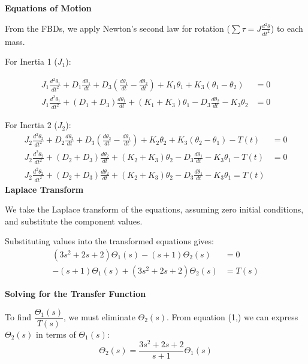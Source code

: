 \documentclass[11pt]{article}
\begin{document}
\noindent\textbf{Equations of Motion}

\vspace{8pt}

\noindent From the FBDs, we apply Newton's second law for rotation ($\sum \tau = J \frac{d^2\theta}{dt^2}$) to each mass.

{For Inertia 1 ($J_1$):}

\begin{align*}
J_1\frac{d^2\theta_1}{dt^2}
+ D_1\frac{d\theta_1}{dt}
+ D_3\!\left(\frac{d\theta_1}{dt}-\frac{d\theta_2}{dt}\right)
+ K_1\theta_1
+ K_3\!\left(\theta_1-\theta_2\right) &= 0 \\[4pt]
J_1\frac{d^2\theta_1}{dt^2}
+ (D_1 + D_3)\frac{d\theta_1}{dt}
+ (K_1 + K_3)\theta_1
- D_3\frac{d\theta_2}{dt}
- K_3\theta_2 &= 0
\end{align*}

\newpage
{For Inertia 2 ($J_2$):}
\begin{align*}
J_2\frac{d^2\theta_2}{dt^2}
+ D_2\frac{d\theta_2}{dt}
+ D_3\!\left(\frac{d\theta_2}{dt}-\frac{d\theta_1}{dt}\right)
+ K_2\theta_2
+ K_3\!\left(\theta_2-\theta_1\right)
- T(t) &= 0 \\[4pt]
J_2\frac{d^2\theta_2}{dt^2}
+ (D_2 + D_3)\frac{d\theta_2}{dt}
+ (K_2 + K_3)\theta_2
- D_3\frac{d\theta_1}{dt}
- K_3\theta_1
- T(t) &= 0 \\[4pt]
J_2\frac{d^2\theta_2}{dt^2}
+ (D_2 + D_3)\frac{d\theta_2}{dt}
+ (K_2 + K_3)\theta_2
- D_3\frac{d\theta_1}{dt}
- K_3\theta_1
= T(t)
\end{align*}
\noindent\textbf{Laplace Transform}
\vspace{8pt}

\noindent We take the Laplace transform of the equations, assuming zero initial conditions, and substitute the component values.
\vspace{8pt}

{Substituting values into the transformed equations gives:}
\begin{align}
    (3s^2 + 2s + 2)\Theta_1(s) - (s + 1)\Theta_2(s) &= 0 \tag{1} \\
    -(s + 1)\Theta_1(s) + (3s^2 + 2s + 2)\Theta_2(s) &= T(s) \tag{2}
\end{align}

\noindent\textbf{Solving for the Transfer Function}
\vspace{8pt}

\noindent To find $\dfrac{\Theta_1(s)}{T(s)}$, we must eliminate $\Theta_2(s)$. From equation (1,) we can express $\Theta_2(s)$ in terms of $\Theta_1(s)$:
\[
\Theta_2(s) = \frac{3s^2 + 2s + 2}{s + 1} \Theta_1(s)
\]
\end{document}
